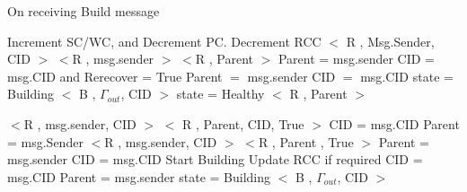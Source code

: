 	
\begin{algorithm}[H]
\caption{On receiving Build message}
\label{Build message received}
\scriptsize
\begin{algorithmic}[1]
\State Increment SC/WC, and Decrement PC.
    \State Decrement RCC
  \EndIf
{}
	\State $<$ R , Msg.Sender, CID $>$
		\State $<$R , msg.sender $>$
	\Else
			\State $<$R , Parent $>$
		\EndIf
		\State Parent = msg.sender
		\State CID = msg.CID and Rerecover = True
	\EndIf
{}
	\State Parent $=$ msg.sender
	\State CID $=$ msg.CID
		\State state = Building
		\State $<$ B , $\Gamma_{out}$, CID $>$
	\Else
		\State state = Healthy
		\State $<$ R , Parent $>$
	\EndIf
	\end{algorithmic}
\end{algorithm}
\begin{algorithm}[H]
\scriptsize
\begin{algorithmic}[1]
		\State $<$R , msg.sender, CID $>$
	\Else
			\State $<$ R , Parent, CID, True $>$
		\EndIf
		\State CID = msg.CID
		\State Parent = msg.Sender
	\EndIf
{}
		\State $<$R , msg.sender, CID $>$
	\Else
			\State $<$R , Parent , True $>$
		\EndIf
		\State Parent = msg.sender
		\State CID = msg.CID
	\EndIf
  \State Start Building
	\State Update RCC if required
	\State CID = msg.CID
	\State Parent = msg.sender
	\State state = Building
	\State $<$ B , $\Gamma_{out}$, CID $>$
\EndIf
\EndProcedure
\end{algorithmic}
\end{algorithm}	


